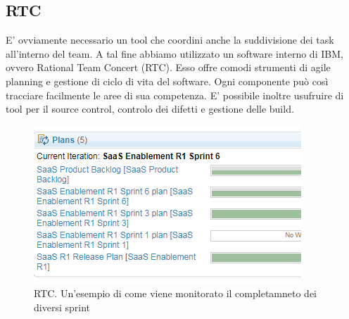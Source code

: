 \subsection{RTC}
E' ovviamente necessario un tool che coordini anche la suddivisione dei task all'interno del team. A tal fine abbiamo utilizzato un software interno di IBM, ovvero Rational Team Concert (RTC). Esso offre comodi strumenti di agile planning e gestione di ciclo di vita del software. Ogni componente può così tracciare facilmente le aree di sua competenza. E' possibile inoltre usufruire di tool per il source control, controlo dei difetti e gestione delle build.
\begin{figure}[h!]
	\centering
	\includegraphics[width=\textwidth,keepaspectratio=true]{capitoli/imgs/rtc2.PNG}
	\caption{RTC. Un'esempio di come viene monitorato il completamneto dei diversi sprint}
\end{figure}


